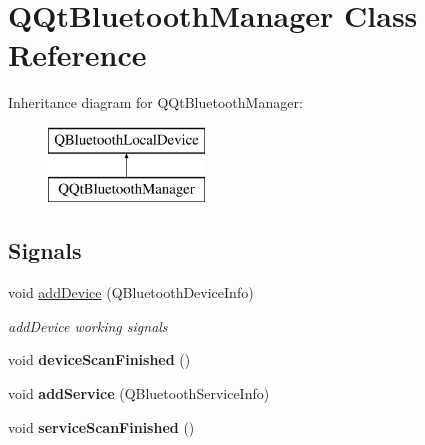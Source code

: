 \hypertarget{class_q_qt_bluetooth_manager}{}\section{Q\+Qt\+Bluetooth\+Manager Class Reference}
\label{class_q_qt_bluetooth_manager}
Inheritance diagram for Q\+Qt\+Bluetooth\+Manager\+:\begin{figure}[H]
\begin{center}
\leavevmode
\includegraphics[height=2.000000cm]{class_q_qt_bluetooth_manager}
\end{center}
\end{figure}
\subsection*{Signals}
\begin{DoxyCompactItemize}
\item 
\mbox{\label{class_q_qt_bluetooth_manager_a38a259becdb71c9f53758aa0c4f6d1b5}} 
void \mbox{\hyperlink{class_q_qt_bluetooth_manager_a38a259becdb71c9f53758aa0c4f6d1b5}{add\+Device}} (Q\+Bluetooth\+Device\+Info)
\begin{DoxyCompactList}\small\item\em add\+Device working signals \end{DoxyCompactList}\item 
\mbox{\label{class_q_qt_bluetooth_manager_a1e751eb3e0eb6cfb45a7de73aa2b9685}} 
void {\bfseries device\+Scan\+Finished} ()
\item 
\mbox{\label{class_q_qt_bluetooth_manager_a4f75a11bf0834028a11bdeaa716da03f}} 
void {\bfseries add\+Service} (Q\+Bluetooth\+Service\+Info)
\item 
\mbox{\label{class_q_qt_bluetooth_manager_a8fcfcc390bed4d2eb642097f40b280d3}} 
void {\bfseries service\+Scan\+Finished} ()
\end{DoxyCompactItemize}
